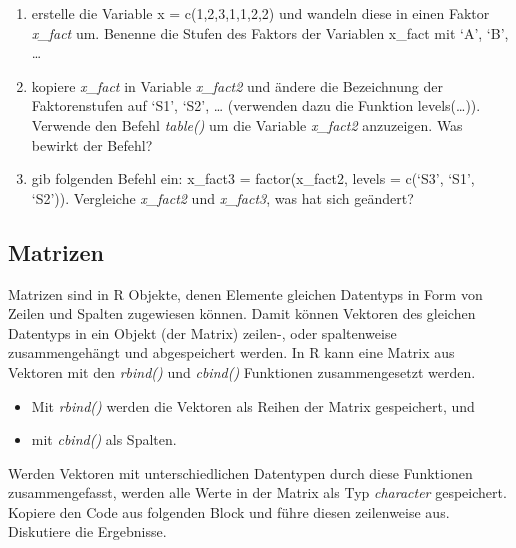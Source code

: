 \documentclass[]{article}
\providecommand{\tightlist}{%
  \setlength{\itemsep}{0pt}\setlength{\parskip}{0pt}}
\begin{document}
\begin{enumerate}
\def\labelenumi{\arabic{enumi}.}
\tightlist
\item
  erstelle die Variable x = c(1,2,3,1,1,2,2) und wandeln diese in einen
  Faktor \emph{x\_fact} um. Benenne die Stufen des Faktors der Variablen
  x\_fact mit `A', `B', \ldots{}
\item
  kopiere \emph{x\_fact} in Variable \emph{x\_fact2} und ändere die
  Bezeichnung der Faktorenstufen auf `S1', `S2', \ldots{} (verwenden
  dazu die Funktion levels(\ldots{})). Verwende den Befehl
  \emph{table()} um die Variable \emph{x\_fact2} anzuzeigen. Was bewirkt
  der Befehl?
\item
  gib folgenden Befehl ein: x\_fact3 = factor(x\_fact2, levels = c(`S3',
  `S1', `S2')). Vergleiche \emph{x\_fact2} und \emph{x\_fact3}, was hat
  sich geändert?
\end{enumerate}

\subsection*{Matrizen}\label{matrizen}

Matrizen sind in R Objekte, denen Elemente gleichen Datentyps in Form
von Zeilen und Spalten zugewiesen können. Damit können Vektoren des
gleichen Datentyps in ein Objekt (der Matrix) zeilen-, oder spaltenweise
zusammengehängt und abgespeichert werden. In R kann eine Matrix aus
Vektoren mit den \emph{rbind()} und \emph{cbind()} Funktionen
zusammengesetzt werden.

\begin{itemize}
\tightlist
\item
  Mit \emph{rbind()} werden die Vektoren als Reihen der Matrix
  gespeichert, und
\item
  mit \emph{cbind()} als Spalten.
\end{itemize}

Werden Vektoren mit unterschiedlichen Datentypen durch diese Funktionen
zusammengefasst, werden alle Werte in der Matrix als Typ
\emph{character} gespeichert. Kopiere den Code aus folgenden Block und
führe diesen zeilenweise aus. Diskutiere die Ergebnisse.
\end{document}
